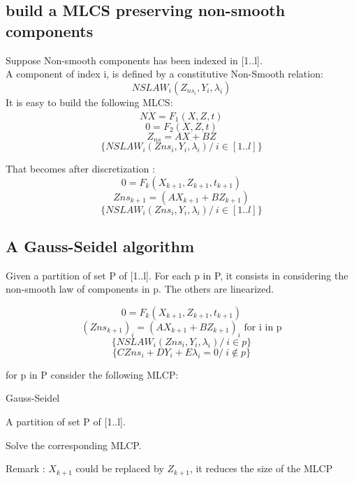 \subsection{build a MLCS preserving non-smooth components}
Suppose Non-smooth components has been indexed in [1..l].\\
A component of index i, is defined by a constitutive Non-Smooth relation:
\[NSLAW_i(Z_{ns_i},Y_i,\lambda _i)\]
It is easy to build the following MLCS:
\[N \dot X=F_1(X,Z,t)\]
\[0=F_2(X,Z,t)\]
\[Z_{ns}= AX+BZ\]
\[\{NSLAW_i(Zns_i,Y_i,\lambda _i) /\ i \in [1..l]\}\]

That becomes after discretization :
\[0=F_k(X_{k+1},Z_{k+1},t_{k+1})\]
\[Zns_{k+1}= (AX_{k+1}+BZ_{k+1}) \]
\[\{NSLAW_i(Zns_i,Y_i,\lambda _i) /\ i \in [1..l]\}\]



\subsection{A Gauss-Seidel algorithm}
Given a partition of set P of [1..l]. For each p in P, it consists in considering the non-smooth law
of components in p. The others are linearized. 

\[0=F_k(X_{k+1},Z_{k+1},t_{k+1})\]
\[(Zns_{k+1})_i= (AX_{k+1}+BZ_{k+1})_i \textrm{ for i in p} \]
\[\{NSLAW_i(Zns_i,Y_i,\lambda _i) /\ i \in p\}\]
\[\{C Zns_i +D Y_i +E \lambda _i =0/\ i \notin p\}\]


for p in P consider the following MLCP:

\begin{algorithm}[H]
\caption{Gauss-Seidel }
\sf
\begin{algorithmic}
\REQUIRE A partition of set P of [1..l]. \\

\STATE Solve the corresponding MLCP.

\ENDFOR
\ENDWHILE

\label{Algo:GAUSS_SEIDEL}
\end{algorithmic}
\end{algorithm}

Remark : $X_{k+1}$ could be replaced by $Z_{k+1}$, it reduces the size of the MLCP